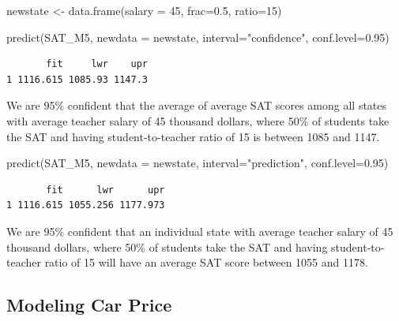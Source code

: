 \documentclass[
  letterpaper,
  DIV=11,
  numbers=noendperiod]{scrreprt}
\newenvironment{Shaded}{\begin{snugshade}}{\end{snugshade}}
\newcommand{\AttributeTok}[1]{\textcolor[rgb]{0.40,0.45,0.13}{#1}}
\newcommand{\DecValTok}[1]{\textcolor[rgb]{0.68,0.00,0.00}{#1}}
\newcommand{\FloatTok}[1]{\textcolor[rgb]{0.68,0.00,0.00}{#1}}
\newcommand{\FunctionTok}[1]{\textcolor[rgb]{0.28,0.35,0.67}{#1}}
\newcommand{\NormalTok}[1]{\textcolor[rgb]{0.00,0.23,0.31}{#1}}
\newcommand{\OtherTok}[1]{\textcolor[rgb]{0.00,0.23,0.31}{#1}}
\newcommand{\StringTok}[1]{\textcolor[rgb]{0.13,0.47,0.30}{#1}}
\begin{document}
\begin{Shaded}
\begin{Highlighting}[]
\NormalTok{newstate }\OtherTok{\textless{}{-}} \FunctionTok{data.frame}\NormalTok{(}\AttributeTok{salary =} \DecValTok{45}\NormalTok{, }\AttributeTok{frac=}\FloatTok{0.5}\NormalTok{, }\AttributeTok{ratio=}\DecValTok{15}\NormalTok{)}
\end{Highlighting}
\end{Shaded}

\begin{Shaded}
\begin{Highlighting}[]
\FunctionTok{predict}\NormalTok{(SAT\_M5, }\AttributeTok{newdata =}\NormalTok{ newstate, }\AttributeTok{interval=}\StringTok{"confidence"}\NormalTok{, }\AttributeTok{conf.level=}\FloatTok{0.95}\NormalTok{)}
\end{Highlighting}
\end{Shaded}

\begin{verbatim}
       fit     lwr    upr
1 1116.615 1085.93 1147.3
\end{verbatim}

We are 95\% confident that the average of average SAT scores among all
states with average teacher salary of 45 thousand dollars, where 50\% of
students take the SAT and having student-to-teacher ratio of 15 is
between 1085 and 1147.

\begin{Shaded}
\begin{Highlighting}[]
\FunctionTok{predict}\NormalTok{(SAT\_M5, }\AttributeTok{newdata =}\NormalTok{ newstate, }\AttributeTok{interval=}\StringTok{"prediction"}\NormalTok{, }\AttributeTok{conf.level=}\FloatTok{0.95}\NormalTok{)}
\end{Highlighting}
\end{Shaded}

\begin{verbatim}
       fit      lwr      upr
1 1116.615 1055.256 1177.973
\end{verbatim}

We are 95\% confident that an individual state with average teacher
salary of 45 thousand dollars, where 50\% of students take the SAT and
having student-to-teacher ratio of 15 will have an average SAT score
between 1055 and 1178.

\subsection{Modeling Car Price}\label{modeling-car-price}
\end{document}

